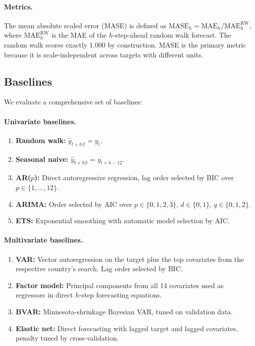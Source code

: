 \documentclass[12pt,a4paper]{article}
\begin{document}
\paragraph{Metrics.} The mean absolute scaled error (MASE) is defined as $\text{MASE}_h = \text{MAE}_h / \text{MAE}_h^{\text{RW}}$, where $\text{MAE}_h^{\text{RW}}$ is the MAE of the $h$-step-ahead random walk forecast. The random walk scores exactly 1.000 by construction. MASE is the primary metric because it is scale-independent across targets with different units.

\subsection{Baselines}
\label{sec:baselines}

We evaluate a comprehensive set of baselines:

\paragraph{Univariate baselines.}
\begin{enumerate}[noitemsep]
    \item \textbf{Random walk:} $\hat{y}_{t+h|t} = y_t$.
    \item \textbf{Seasonal naive:} $\hat{y}_{t+h|t} = y_{t+h-12}$.
    \item \textbf{AR($p$):} Direct autoregressive regression, lag order selected by BIC over $p \in \{1, \ldots, 12\}$.
    \item \textbf{ARIMA:} Order selected by AIC over $p \in \{0,1,2,3\}$, $d \in \{0,1\}$, $q \in \{0,1,2\}$.
    \item \textbf{ETS:} Exponential smoothing with automatic model selection by AIC.
\end{enumerate}

\paragraph{Multivariate baselines.}
\begin{enumerate}
    \item \textbf{VAR:} Vector autoregression on the target plus the top covariates from the respective country's search. Lag order selected by BIC.
    \item \textbf{Factor model:} Principal components from all 14 covariates used as regressors in direct $h$-step forecasting equations.
    \item \textbf{BVAR:} Minnesota-shrinkage Bayesian VAR, tuned on validation data.
    \item \textbf{Elastic net:} Direct forecasting with lagged target and lagged covariates, penalty tuned by cross-validation.
\end{enumerate}
\end{document}
